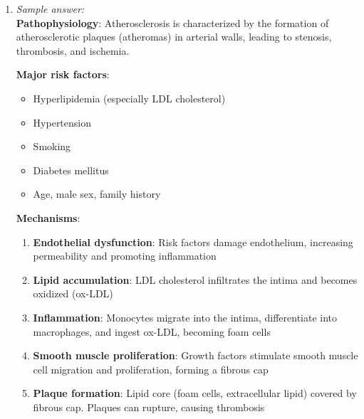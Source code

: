 \documentclass[11pt]{article}
\begin{document}
\begin{enumerate}[label=\textbf{\arabic*.}]
  \textbf{Malignant tumors}:
  \begin{itemize}
    \item \textbf{Growth}: Rapid, infiltrative
    \item \textbf{Invasion}: Invade adjacent tissues and destroy normal architecture
    \item \textbf{Metastasis}: Spread to distant sites via lymphatics and blood
    \item \textbf{Differentiation}: Poorly differentiated (anaplastic) to well-differentiated
    \item Example: Liposarcoma (malignant adipose tumor)
  \end{itemize}

  \textbf{Why metastasis is critical}: Metastasis is the primary cause of cancer-related mortality. 
  Local tumors can often be surgically removed, but metastatic disease is difficult to treat and 
  leads to multi-organ failure. The ability to metastasize definitively classifies a tumor as malignant.

  \item \emph{Sample answer:}\\
  \textbf{Pathophysiology}: Atherosclerosis is characterized by the formation of atherosclerotic 
  plaques (atheromas) in arterial walls, leading to stenosis, thrombosis, and ischemia.

  \textbf{Major risk factors}:
  \begin{itemize}
    \item Hyperlipidemia (especially LDL cholesterol)
    \item Hypertension
    \item Smoking
    \item Diabetes mellitus
    \item Age, male sex, family history
  \end{itemize}

  \textbf{Mechanisms}:
  \begin{enumerate}
    \item \textbf{Endothelial dysfunction}: Risk factors damage endothelium, increasing permeability 
    and promoting inflammation
    \item \textbf{Lipid accumulation}: LDL cholesterol infiltrates the intima and becomes oxidized (ox-LDL)
    \item \textbf{Inflammation}: Monocytes migrate into the intima, differentiate into macrophages, 
    and ingest ox-LDL, becoming foam cells
    \item \textbf{Smooth muscle proliferation}: Growth factors stimulate smooth muscle cell migration 
    and proliferation, forming a fibrous cap
    \item \textbf{Plaque formation}: Lipid core (foam cells, extracellular lipid) covered by fibrous 
    cap. Plaques can rupture, causing thrombosis
  \end{enumerate}


\end{enumerate}
\end{document}
